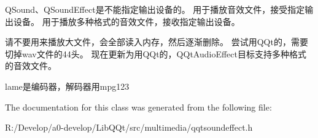 Q\+Sound、\+Q\+Sound\+Effect是不能指定输出设备的。 用于播放音效文件，接受指定输出设备。 用于播放多种格式的音效文件，接收指定输出设备。

请不要用来播放大文件，会全部读入内存，然后逐渐删除。 尝试用\+Q\+Qt的，需要切掉wav文件的44头。 现在更新为用\+Q\+Qt的，\+Q\+Qt\+Audio\+Effect目标支持多种格式的音效文件。

lame是编码器，解码器用mpg123 

The documentation for this class was generated from the following file\+:\begin{DoxyCompactItemize}
\item 
R\+:/\+Develop/a0-\/develop/\+Lib\+Q\+Qt/src/multimedia/qqtsoundeffect.\+h\end{DoxyCompactItemize}
